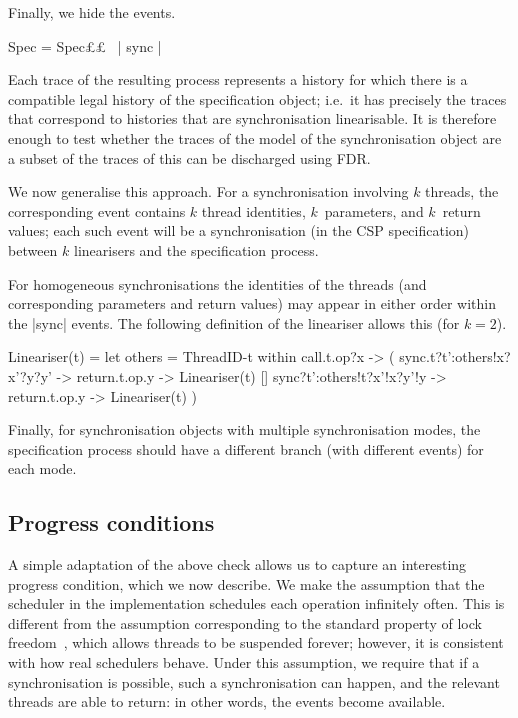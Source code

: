 Finally, we hide the  events. 
\begin{cspm}
Spec = Spec££ \ {| sync |}
\end{cspm}
%
Each trace of the resulting process represents a history for which there is a
compatible legal history of the specification object; i.e.~it has precisely
the traces that correspond to histories that are synchronisation linearisable.
It is therefore enough to test whether the traces of the model of the
synchronisation object are a subset of the traces of  this can be
discharged using FDR.

We now generalise this approach.  For a synchronisation involving $k$ threads,
the corresponding  event contains $k$ thread identities,
$k$~parameters, and $k$~return values; each such event will be a
synchronisation (in the CSP specification) between $k$ linearisers and the
specification process.

For homogeneous synchronisations the identities of the threads (and
corresponding parameters and return values) may appear in either order within
the |sync| events.  The following definition of the lineariser allows this
(for $k = 2$). 
%
\begin{cspm}
Lineariser(t) = 
  let others = ThreadID-{t} within
  call.t.op?x -> (
    sync.t?t':others!x?x'?y?y' -> return.t.op.y -> Lineariser(t)
    []
    sync?t':others!t?x'!x?y'!y -> return.t.op.y -> Lineariser(t)
  )
\end{cspm}

Finally, for synchronisation objects with multiple synchronisation modes, the
specification process should have a different branch (with different
 events) for each mode.


\subsection{Progress conditions}

A simple adaptation of the above check allows us to capture an interesting
progress condition, which we now describe.  We make the assumption that the
scheduler in the implementation schedules each operation infinitely often.
This is different from the assumption corresponding to the standard property
of lock freedom~\cite{herlihy-shavit}, which allows threads to be suspended
forever; however, it is consistent with how real schedulers behave.
%
Under this assumption, we require that if a synchronisation is possible,
such a synchronisation can happen, and the relevant threads are able to
return: in other words, the  events become available. 

